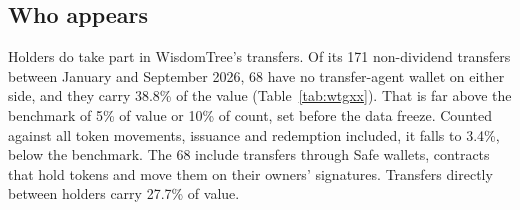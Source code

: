\documentclass[12pt,a4paper]{article}
\begin{document}
\subsection{Who appears}\label{sec:m1}
Holders do take part in WisdomTree's transfers. Of its 171 non-dividend transfers between January and September 2026, 68 have no transfer-agent wallet on either side, and they carry 38.8\% of the value (Table~\ref{tab:wtgxx}). That is far above the benchmark of 5\% of value or 10\% of count, set before the data freeze. Counted against all token movements, issuance and redemption included, it falls to 3.4\%, below the benchmark. The 68 include transfers through Safe wallets, contracts that hold tokens and move them on their owners' signatures. Transfers directly between holders carry 27.7\% of value.
\end{document}
